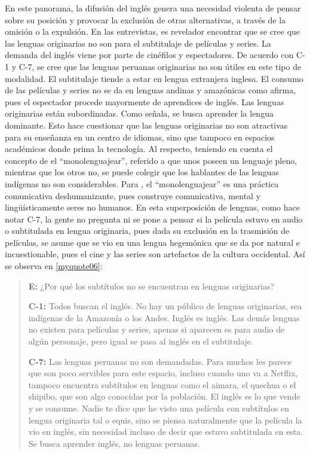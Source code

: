 \documentclass[spanish]{textolivre}
\newenvironment{MyQuote}{%
    \begin{myQuoteEnumerate}[resume=*,series=MyQuoteSeries]%
    \item \begin{quote}%
}{%
    \end{quote}%
    \end{myQuoteEnumerate}%
}%
\begin{document}
En este panorama, la difusión del inglés genera una necesidad violenta de pensar sobre su posición y provocar la exclusión de otras alternativas, a través de la omisión o la expulsión. En las entrevistas, es revelador encontrar que se cree que las lenguas originarias no son para el subtitulaje de películas y series. La demanda del inglés viene por parte de cinéfilos y espectadores. De acuerdo con C-1 y C-7, se cree que las lenguas peruanas originarias no son útiles en este tipo de modalidad. El subtitulaje tiende a estar en lengua extranjera inglesa. El consumo de las películas y series no se da en lenguas andinas y amazónicas como afirma, pues el espectador procede mayormente de aprendices de inglés. Las lenguas originarias están subordinadas. Como señala, se busca aprender la lengua dominante. Esto hace cuestionar que las lenguas originarias no son atractivas para su enseñanza en un centro de idiomas, sino que tampoco en espacios académicos donde prima la tecnología. Al respecto, teniendo en cuenta el concepto de el “monolenguajear”, referido a que unos poseen un lenguaje pleno, mientras que los otros no, se puede colegir que los hablantes de las lenguas indígenas no son considerables. Para \textcite{veronelli_colonialidad_2019}, el “monolenguajear” es una práctica comunicativa deshumanizante, pues construye comunicativa, mental y lingüísticamente seres no humanos. En esta superposición de lenguas, como hace notar C-7, la gente no pregunta ni se pone a pensar si la película estuvo en audio o subtitulada en lengua originaria, pues dada su exclusión en la trasmisión de películas, se asume que se vio en una lengua hegemónica que se da por natural e incuestionable, pues el cine y las series son artefactos de la cultura occidental. Así se observa en \ref{myquote06}:

\begin{MyQuote}\label{myquote06}
\textbf{E:} ¿Por qué los subtítulos no se encuentran en lenguas originarias?

\textbf{C-1:} Todos buscan el inglés. No hay un público de lenguas originarias, sea indígenas de la Amazonía o los Andes. Inglés es inglés. Las demás lenguas no existen para películas y series, apenas si aparecen es para audio de algún personaje, pero igual se pasa al inglés en el subtitulaje.

\textbf{C-7:} Las lenguas peruanas no son demandadas. Para muchos les parece que son poco servibles para este espacio, incluso cuando uno va a Netflix, tampoco encuentra subtítulos en lenguas como el aimara, el quechua o el shipibo, que son algo conocidas por la población. El inglés es lo que vende y se consume. Nadie te dice que he visto una película con subtítulos en lengua originaria tal o equis, sino se piensa naturalmente que la película la vio en inglés, sin necesidad incluso de decir que estuvo subtitulada en esta. Se busca aprender inglés, no lenguas peruanas.
\end{MyQuote}
\end{document}
